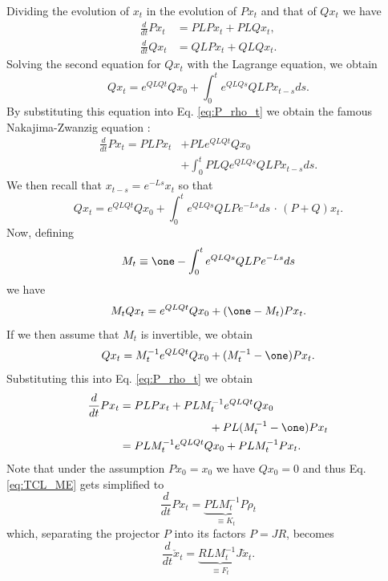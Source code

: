 \documentclass[10pt,aps,pra,twocolumn,showpacs,superscriptaddress,nobalancelastpage,notitlepage,nofootinbib,longbibliography]{revtex4-2}
\begin{document}
Dividing the evolution of $x_t$ in the evolution of $P x_t$ and that of $Q x_t$ we have 
\begin{align}
    \frac{d}{dt}P x_t &= P LP x_t + PLQ x_t,\label{eq:P_rho_t}\\
    \frac{d}{dt}Q x_t &= QLP x_t + QLQ x_t.
\end{align}
Solving the second equation for $Q x_t$ with the Lagrange equation, we obtain
\[Qx_t = e^{QLQ t} Qx_0 + \int_0^t e^{QLQ s }QLP x_{t-s} ds.\]
By substituting this equation into Eq. \eqref{eq:P_rho_t} we obtain the famous Nakajima-Zwanzig equation \cite{nakajima,zwanzig}:
\begin{align}
    \frac{d}{dt}P x_t = PLP x_t &+ PL e^{QLQ t} Qx_0 \nonumber\\&+\int_0^t PLQ e^{QLQ s }QLP x_{t-s} ds.
\end{align}
We then recall that 
\(x_{t-s} = e^{-L s}x_t\)
so that 
\[Qx_t = e^{QLQ t} Qx_0 +\int_0^t e^{QLQ s }QLP e^{-L s} ds\, \cdot\, (P + Q) x_t. \]
Now, defining 
\begin{equation}
    M_t \equiv \one - \int_0^t e^{QLQ s }QLP e^{-L s} ds
    \label{eq:M_t}
\end{equation}
we have 
\[M_t Qx_t = e^{QLQ t} Qx_0 + (\one-M_t) Px_t.\]
If we then assume that $M_t$ is invertible, we obtain 
\[Qx_t = M_t^{-1}e^{QLQ t} Qx_0 + (M_t^{-1} -\one) P x_t.\]
Substituting this into Eq. \eqref{eq:P_rho_t} we obtain 
\begin{align}
    \frac{d}{dt}Px_t &= PLP x_t + PLM_t^{-1}e^{QLQ t} Qx_0 \nonumber \\& \qquad\qquad\qquad\qquad+ PL (M_t^{-1}-\one) P x_t \nonumber\\ &= PLM_t^{-1}e^{QLQ t} Qx_0 + PLM_t^{-1} Px_t.
    \label{eq:TCL_ME}
\end{align}
Note that under the assumption $Px_0=x_0$ we have $Qx_0=0$ and thus Eq. \eqref{eq:TCL_ME} gets simplified to 
\begin{equation}
  \frac{d}{dt}Px_t = \underbrace{PLM_t^{-1} P}_{\equiv K_t} \rho_t  
  \label{eq:tcl_me_no_affine}
\end{equation}
which, separating the projector $P$ into its factors $P = JR$, becomes  
\begin{equation}
    \frac{d}{dt}\check{x}_t = \underbrace{RL M_t^{-1} J}_{\equiv F_t} \check{x}_t.
    \label{eq:tcl_me_reduced}
\end{equation}
\end{document}
